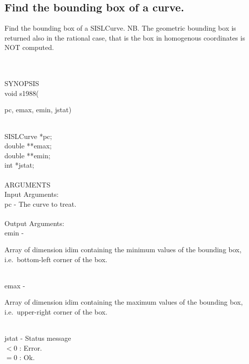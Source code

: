 \subsection{Find the bounding box of a curve.}
\begin{minipg1}
Find the bounding box of a SISLCurve. NB. The geometric
               bounding box is returned also in the rational case, that
               is the box in homogenous coordinates is NOT computed.
\end{minipg1} \\ \\
SYNOPSIS\\
        \> void s1988(\begin{minipg3}
          {\fov pc}, {\fov emax}, {\fov emin}, {\fov jstat})
        \end{minipg3}\\[0.3ex]
        \>\>    SISLCurve \> *{\fov pc};\\
        \>\>    double    \> **{\fov emax};\\
        \>\>    double    \> **{\fov emin};\\
        \>\>    int       \> *{\fov jstat};\\
\\
ARGUMENTS\\
        \>Input Arguments:\\
        \>\>    {\fov pc} \> - \> The curve to treat.\\
\\
        \>Output Arguments:\\
        \>\>    {\fov emin} \> - \>
        \begin{minipg2}
          Array of dimension {\fov idim} containing
          the minimum values of the bounding box,
          i.e.\ bottom-left corner of the box.
        \end{minipg2}\\[0.8ex]
        \>\>    {\fov emax} \> - \>
        \begin{minipg2}
          Array of dimension {\fov idim} containing
          the maximum values of the bounding box,
          i.e.\ upper-right corner of the box.
        \end{minipg2}\\[0.8ex]
        \>\>    {\fov jstat}  \> - \> Status message\\
                \>\>\>\>\> $< 0$ : Error.\\
                \>\>\>\>\> $= 0$ : Ok.\\
